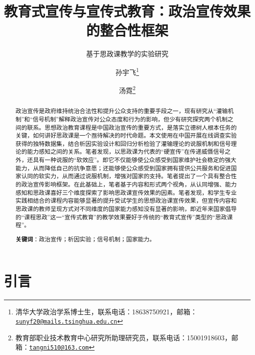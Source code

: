 \documentclass[
  12pt,
]{ctexart}
\title{教育式宣传与宣传式教育：政治宣传效果的整合性框架}
\subtitle{基于思政课教学的实验研究}
\author{孙宇飞\footnote{清华大学政治学系博士生，联系电话：18638750921，邮箱：\href{mailto:sunyf20@mails.tsinghua.edu.cn}{\nolinkurl{sunyf20@mails.tsinghua.edu.cn}}} \and 汤霓\footnote{教育部职业技术教育中心研究所助理研究员，联系电话：15001918603，邮箱：\href{mailto:tangni510@163.com}{\nolinkurl{tangni510@163.com}}}}
\date{}
\begin{document}
\maketitle
\begin{abstract}
政治宣传是政府维持统治合法性和提升公众支持的重要手段之一，现有研究从``灌输机制''和``信号机制''解释政治宣传对公众态度和行为的影响，但少有研究探究两个机制之间的联系。思想政治教育课程是中国政治宣传的重要方式，是落实立德树人根本任务的关键，如何讲好思政课是一个亟待解决的时代命题。本文使用在中国开展在线调查实验获得的独特数据集，结合析因实验设计和回归分析检验了灌输理论的说服机制和信号理论的能力感知之间的关系。笔者发现，以思政课为代表的``硬宣传''在传递威慑信号之外，还具有一种说服的``软效应''。即它不仅能够使公众感受到国家维护社会稳定的强大能力，从而降低自己的抗争意愿；还能够使公众感受到国家拥有提供公共服务和促进国家认同的软实力，从而通过说服机制，增强对国家的支持。笔者提出了一个具有整合性的政治宣传影响框架。在此基础上，笔者基于内容和形式两个视角，从认同增强、能力感知和思政课喜好三个维度探索了影响思政课宣传效果的因素。笔者发现，和学生专业实践相结合的课程内容能够显著的提升受试学生的思想政治课宣传效果，但宣传内容和思政课的教师呈现方式对不同维度的国家能力感知没有显著的影响，即近年来国家倡导的``课程思政''这一``宣传式教育''的教学效果要好于传统的``教育式宣传''类型的``思政课程''。

\textbf{关键词}：政治宣传；析因实验；信号机制；国家能力。
\end{abstract}

\newpage

\hypertarget{ux5f15ux8a00}{%
\section{引言}\label{ux5f15ux8a00}}
\end{document}
